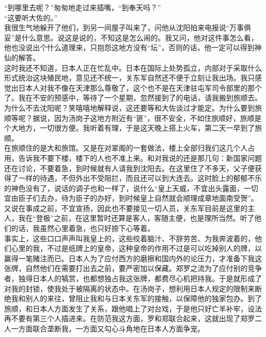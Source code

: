 “到哪里去呢？”匆匆地走过来插嘴，“到奉天吗？”\\

“这要听大佐的。”\\

我很生气地躲开了他们，到另一间屋子叫来了，问他从沈阳拍来电报说“万事俱妥”是什么意思。说这是说的，不知这是怎么闹的。我又问，他对这件事怎么看，他也没说出个什么道理来，只抱怨这地方没有“坛”，否则的话，他一定可以得到神仙的解答。\\

这时我还不知道，日本人正在忙乱中。日本在国际上处势孤立，内部对于采取什么形式统治这块殖民地，意见还不统一，关东军自然还不便于立刻让我出场。我只感觉出日本人对我不像在天津那么尊敬了，这个也不是在天津驻屯军司令部里的那个了。我在不安的预感中，等待了一个星期，忽然接到了的电话，请我搬到旅顺去。\\

为什么不去沈阳呢？笑嘻嘻地解释说，这还要等和大佐谈过才能定。为什么要到旅顺等呢？据说，因为汤岗子这地方附近有“匪”，很不安全，不如住旅顺好，旅顺是个大地方，一切很方便。我听着有理，于是这天晚上搭上火车，第二天一早到了旅顺。\\

在旅顺住的是大和旅馆。又是在对翠阁的一套做法，楼上全部归我们这几个人占用，告诉我不要下楼，楼下的人也不准上来。和对我说的还是那几句：新国家问题还在讨论，不要着急，到时候就有人请我到沈阳去。在这里住了不多天，父子便获得了一样的待遇，不但外出不受阻拦，而且还可以到大连去。这时脸上的郁郁不乐的神色没有了，说话的调子也和一样了，说什么“皇上天威，不宜出头露面，一切宜由臣子们去办，待为臣子的办好，到时候皇上自然就会顺理成章地面南受贺”。又说在事成之前，不宜宣扬，因此也不要接见一切人员，关东军目前是这里的主人，我在“登极”之前，在这里暂时还算是客人，客随主便，也是理所当然。听了他们的话，我虽然心里着急，也只好捺下心等着。\\

事实上，这些口口声声叫我皇上的，这些绞着脑汁、不辞劳苦、为我奔波着的，他们心里的我，不过是纸牌上的皇帝，这种皇帝的作用不过是可以吃掉别人的牌，以赢得一笔赌注而已。日本人为了应付西方的磨擦和国内外的论压力，才准备下我这张牌，自然他们在需要打出去之前，要严密加以保藏。郑罗之流为了应付别的竞争者，独得日本人的犒赏，也都想独占我这张牌，都费尽心机把持我。于是就形成了对我的封锁，使我处于被隔离的状态中。在汤岗子，想利用日本人规定的限制来断绝我和别人的来往，曾阻止我和与日本关东军的接触，以保障他的独家包办。到了旅顺，和日本人方面发生了关系，跟他唱上了对台戏，于是他只好亡羊补牢，设法再不要有第三个人插进来。在防范我这方面，罗和郑联合起来，这就出现了郑罗二人一方面联合垄断我，一方面又勾心斗角地在日本人方面争宠。\\

